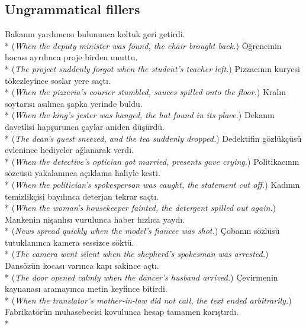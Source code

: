 \subsection{Ungrammatical fillers}
\ea * Bakan{\i}n yard{\i}mc{\i}s{\i} bulununca koltuk geri getirdi. \\*
({\it * When the deputy minister was found, the chair brought back.})
\ex * \"{O}\u{g}rencinin hocas{\i} ayr{\i}l{\i}nca proje birden unuttu. \\*
({\it * The project suddenly forgot when the student's teacher left.})
\ex * Pizzac{\i}n{\i}n kuryesi t\"{o}kezleyince soslar yere sa\c{c}t{\i}. \\*
({\it * When the pizzeria's courier stumbled, sauces spilled onto the floor.})
\ex * Kral{\i}n soytar{\i}s{\i} as{\i}l{\i}nca \c{s}apka yerinde buldu. \\*
({\it * When the king's jester was hanged, the hat found in its place.})
\ex * Dekan{\i}n davetlisi hap\c{s}urunca \c{c}aylar aniden d\"{u}\c{s}\"{u}rd\"{u}. \\*
({\it * The dean's guest sneezed, and the tea suddenly dropped.})
\ex * Dedektifin g\"{o}zl\"{u}k\c{c}\"{u}s\"{u} evlenince hediyeler a\u{g}lanarak verdi. \\*
({\it * When the detective's optician got married, presents gave crying.})
\ex * Politikac{\i}n{\i}n s\"{o}zc\"{u}s\"{u} yakalan{\i}nca a\c{c}{\i}klama haliyle kesti. \\*
({\it * When the politician's spokesperson was caught, the statement cut off.})
\ex * Kad{\i}n{\i}n temizlik\c{c}isi bay{\i}l{\i}nca deterjan tekrar sa\c{c}t{\i}. \\*
({\it * When the woman's housekeeper fainted, the detergent spilled out again.})
\ex * Mankenin ni\c{s}anl{\i}s{\i} vurulunca haber h{\i}zl{\i}ca yayd{\i}. \\*
({\it * News spread quickly when the model's fiancee was shot.})
\ex * \c{C}oban{\i}n s\"{o}zl\"{u}s\"{u} tutuklan{\i}nca kamera sessizce s\"{o}kt\"{u}. \\*
({\it * The camera went silent when the shepherd's spokesman was arrested.})
\ex * Dans\"{o}z\"{u}n kocas{\i} var{\i}nca kap{\i} sakince a\c{c}t{\i}. \\*
({\it * The door opened calmly when the dancer's husband arrived.})
\ex * \c{C}evirmenin kaynanas{\i} aramay{\i}nca metin keyfince bitirdi. \\*
({\it * When the translator's mother-in-law did not call, the text ended arbitrarily.})
\ex * Fabrikat\"{o}r\"{u}n muhasebecisi kovulunca hesap tamamen kar{\i}\c{s}t{\i}rd{\i}. \\*

